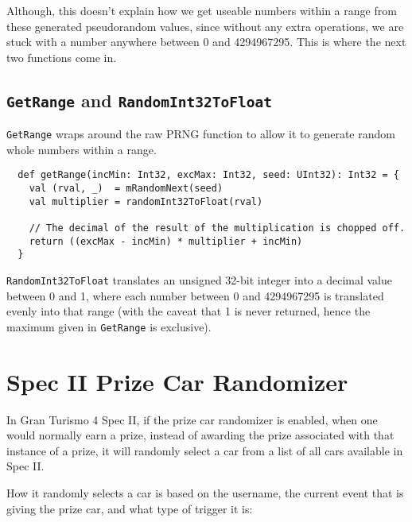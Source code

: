 \documentclass[14pt,a4paper,notitlepage]{extarticle}
\begin{document}
                Although, this doesn't explain how we get useable numbers within a range
                from these generated pseudorandom values, since without any extra operations,
                we are stuck with a number anywhere between 0 and 4294967295. This is where the
                next two functions come in.

            \subsection*{\texttt{GetRange} and \texttt{RandomInt32ToFloat}}
                \texttt{GetRange} wraps around the raw PRNG function to allow it to generate
                random whole numbers within a range.

                \begin{lstlisting}
  def getRange(incMin: Int32, excMax: Int32, seed: UInt32): Int32 = {
    val (rval, _)  = mRandomNext(seed)
    val multiplier = randomInt32ToFloat(rval)

    // The decimal of the result of the multiplication is chopped off.
    return ((excMax - incMin) * multiplier + incMin)
  }
                \end{lstlisting}

                \noindent \texttt{RandomInt32ToFloat} translates an unsigned 32-bit integer
                into a decimal value between 0 and 1, where each number between 0 and 4294967295
                is translated evenly into that range (with the caveat that 1 is never returned,
                hence the maximum given in \texttt{GetRange} is exclusive).

    \section*{Spec II Prize Car Randomizer}
        In Gran Turismo 4 Spec II, if the prize car randomizer is enabled, when one would
        normally earn a prize, instead of awarding the prize associated with that instance of
        a prize, it will randomly select a car from a list of all cars available in Spec II.

        How it randomly selects a car is based on the username, the current event that is
        giving the prize car, and what type of trigger it is:
\end{document}
